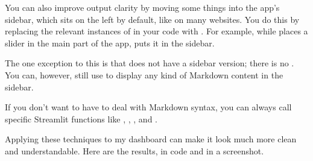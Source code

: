 \documentclass[letterpaper,10pt,english]{sphinxmanual}
\begin{document}
\begin{sphinxVerbatim}[commandchars=\\\{\}]
 




 
\end{sphinxVerbatim}

You can also improve output clarity by moving some things into the app’s sidebar, which sits on the left by default, like on many websites.  You do this by replacing the relevant instances of  in your code with .  For example, while  places a slider in the main part of the app,  puts it in the sidebar.

The one exception to this is that  does not have a sidebar version; there is no .  You can, however, still use  to display any kind of Markdown content in the sidebar.

If you don’t want to have to deal with Markdown syntax, you can always call specific Streamlit functions like , , , and .

Applying these techniques to my dashboard can make it look much more clean and understandable.  Here are the results, in code and in a screenshot.
\end{document}
